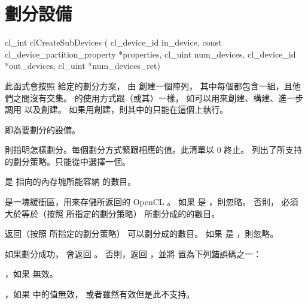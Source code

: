 \section{劃分設備}


\startCLFUNC
cl_int clCreateSubDevices (
		cl_device_id in_device,
		const cl_device_partition_property *properties,
		cl_uint num_devices,
		cl_device_id *out_devices,
		cl_uint *num_devices_ret)
\stopCLFUNC

此函式會按照  給定的劃分方案，
由  創建一個陣列，
其中每個都包含一組，且他們之間沒有交集。
的使用方式跟（或其）一樣，
如可以用來創建、構建、進一步調用  以及創建。
如果用創建，則其中的只能在這個上執行。

 即為要劃分的設備。

 則指明怎樣劃分。每個劃分方式緊跟相應的值。此清單以 0 終止。
列出了所支持的劃分策略。只能從中選擇一個。

{}

 是  指向的內存塊所能容納  的數目。

 是一塊緩衝區，用來存儲所返回的 OpenCL 。
如果  是 ，則忽略。
否則，  必須大於等於（按照  所指定的劃分策略）
所劃分成的的數目。

 返回（按照  所指定的劃分策略）
可以劃分成的數目。
如果  是 ，則忽略。

如果劃分成功，  會返回 。
否則，返回 ，並將  置為下列錯誤碼之一：

\startigBase
\item {}，如果  無效。

\item {}，如果  中的值無效，
或者雖然有效但是此不支持。

